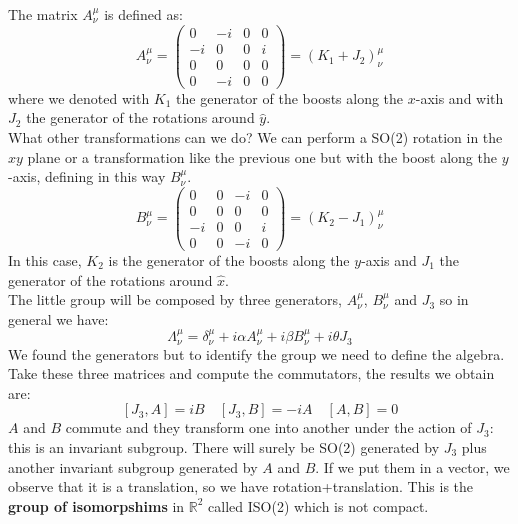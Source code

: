 \documentclass[../main.tex]{subfiles}
\begin{document}
The matrix $A^\mu_\nu$ is defined as:
\[
A^\mu_\nu=\left(\begin{array}{cccc}
    0 & -i & 0 & 0 \\
    -i & 0 & 0 & i \\
    0 & 0 & 0 & 0 \\
    0 & -i & 0 & 0
\end{array}\right)=(K_1+J_2)^\mu_\nu
\]
where we denoted with $K_1$ the generator of the boosts along the $x$-axis and with $J_2$ the generator of the rotations around $\hat{y}$.\\
What other transformations can we do? We can perform a SO(2) rotation in the $xy$ plane or a transformation like the previous one but with the boost along the $y$-axis, defining in this way $B^\mu_\nu$.
\[
B^\mu_\nu=\left(\begin{array}{cccc}
    0 & 0 & -i & 0 \\
    0 & 0 & 0 & 0 \\
    -i & 0 & 0 & i \\
    0 & 0 & -i & 0
\end{array}\right)=(K_2-J_1)^\mu_\nu
\]
In this case, $K_2$ is the generator of the boosts along the $y$-axis and $J_1$ the generator of the rotations around $\hat{x}$.\\
The little group will be composed by three generators, $A^\mu_\nu$, $B^\mu_\nu$ and $J_3$ so in general we have:\marginnote{\[
J_3=\left(\begin{array}{cccc}
    0 & 0 & 0 & 0 \\
    0 & 0 & -i & 0 \\
    0 & +i & 0 & 0 \\
    0 & 0 & 0 & 0
\end{array}\right)
\]}
\[
\Lambda^\mu_\nu=\delta^\mu_\nu+i\alpha A^\mu_\nu+i\beta B^\mu_\nu+i\theta J_3
\]
We found the generators but to identify the group we need to define the algebra. Take these three matrices and compute the commutators, the results we obtain are:
\[
[J_3,A]=iB \quad [J_3,B]=-iA \quad [A,B]=0
\]
$A$ and $B$ commute and they transform one into another under the action of $J_3$: this is an invariant subgroup. There will surely be SO(2) generated by $J_3$ plus another invariant subgroup generated by $A$ and $B$. If we put them in a vector, we observe that it is a translation, so we have rotation+translation. This is the \textbf{group of isomorpshims} in $\mathbb{R}^2$ called ISO(2) which is not compact.\\
\end{document}
